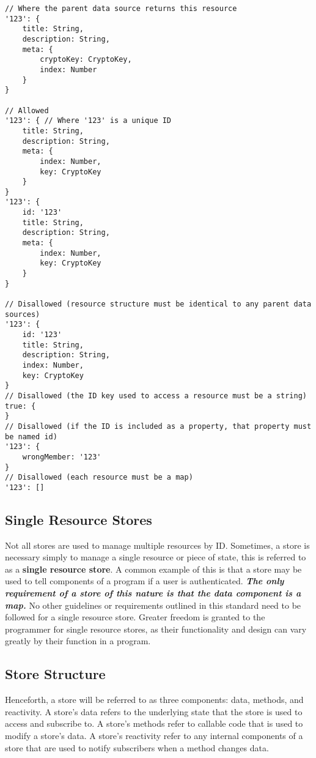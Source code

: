 \documentclass{article}
\begin{document}
\begin{lstlisting}[caption=Valid Resource Structure]
// Where the parent data source returns this resource
'123': {
    title: String,
    description: String,
    meta: {
        cryptoKey: CryptoKey,
        index: Number
    }
}

// Allowed
'123': { // Where '123' is a unique ID
    title: String,
    description: String,
    meta: {
        index: Number,
        key: CryptoKey
    }
}
'123': {
    id: '123'
    title: String,
    description: String,
    meta: {
        index: Number,
        key: CryptoKey
    }
}

// Disallowed (resource structure must be identical to any parent data sources)
'123': {
    id: '123'
    title: String,
    description: String,
    index: Number,
    key: CryptoKey
}
// Disallowed (the ID key used to access a resource must be a string)
true: {
}
// Disallowed (if the ID is included as a property, that property must be named id)
'123': {
    wrongMember: '123'
}
// Disallowed (each resource must be a map)
'123': []
\end{lstlisting}

\subsection{Single Resource Stores}
Not all stores are used to manage multiple resources by ID. Sometimes, a store is necessary simply to manage a single resource or piece of state, this is referred to as a \textbf{single resource store}. A common example of this is that a store may be used to tell components of a program if a user is authenticated. \textbf{\textit{The only requirement of a store of this nature is that the data component is a map.}} No other guidelines or requirements outlined in this standard need to be followed for a single resource store. Greater freedom is granted to the programmer for single resource stores, as their functionality and design can vary greatly by their function in a program.

\subsection{Store Structure}

Henceforth, a store will be referred to as three components: data, methods, and reactivity. A store's data refers to the underlying state that the store is used to access and subscribe to. A store's methods refer to callable code that is used to modify a store's data. A store's reactivity refer to any internal components of a store that are used to notify subscribers when a method changes data.
\end{document}
